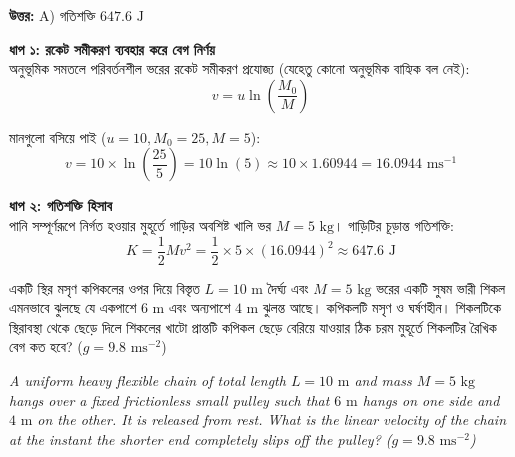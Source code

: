 \documentclass[12pt, a4paper]{article}
\begin{document}
\vspace{0.5em}
\begin{tcolorbox}[answerbox]
    \textbf{\color{success} উত্তর:} A) গতিশক্তি $647.6\text{ J}$
\end{tcolorbox}
\vspace{1em}

\begin{tcolorbox}[solutionbox={সমাধান (Solution)}]
    \noindent
    \textbf{ধাপ ১: রকেট সমীকরণ ব্যবহার করে বেগ নির্ণয়} \\
    অনুভূমিক সমতলে পরিবর্তনশীল ভরের রকেট সমীকরণ প্রযোজ্য (যেহেতু কোনো অনুভূমিক বাহ্যিক বল নেই):
    \[ v = u \ln\left(\frac{M_0}{M}\right) \]
    
    মানগুলো বসিয়ে পাই ($u = 10, M_0 = 25, M = 5$):
    \[ v = 10 \times \ln\left(\frac{25}{5}\right) = 10 \ln(5) \approx 10 \times 1.60944 = 16.0944\text{ ms}^{-1} \]
    
    \vspace{0.5em}
    \noindent\textbf{ধাপ ২: গতিশক্তি হিসাব} \\
    পানি সম্পূর্ণরূপে নির্গত হওয়ার মুহূর্তে গাড়ির অবশিষ্ট খালি ভর $M = 5\text{ kg}$। গাড়িটির চূড়ান্ত গতিশক্তি:
    \[ K = \frac{1}{2} M v^2 = \frac{1}{2} \times 5 \times (16.0944)^2 \approx \mathbf{647.6}\text{ J} \]
\end{tcolorbox}
\newpage

\begin{tcolorbox}[questionbox={প্রশ্ন (Question) 42}]
    \noindent
    একটি স্থির মসৃণ কপিকলের ওপর দিয়ে বিস্তৃত $L = 10\text{ m}$ দৈর্ঘ্য এবং $M = 5\text{ kg}$ ভরের একটি সুষম ভারী শিকল এমনভাবে ঝুলছে যে একপাশে $6\text{ m}$ এবং অন্যপাশে $4\text{ m}$ ঝুলন্ত আছে। কপিকলটি মসৃণ ও ঘর্ষণহীন। শিকলটিকে স্থিরাবস্থা থেকে ছেড়ে দিলে শিকলের খাটো প্রান্তটি কপিকল ছেড়ে বেরিয়ে যাওয়ার ঠিক চরম মুহূর্তে শিকলটির রৈখিক বেগ কত হবে? ($g = 9.8\text{ ms}^{-2}$)
    
    \vspace{0.8em}
    \begin{english}
    \noindent\textit{\color{darkgray}
    A uniform heavy flexible chain of total length $L = 10\text{ m}$ and mass $M = 5\text{ kg}$ hangs over a fixed frictionless small pulley such that $6\text{ m}$ hangs on one side and $4\text{ m}$ on the other. It is released from rest. What is the linear velocity of the chain at the instant the shorter end completely slips off the pulley? ($g = 9.8\text{ ms}^{-2}$)
    }
    \end{english}
\end{tcolorbox}
\end{document}
